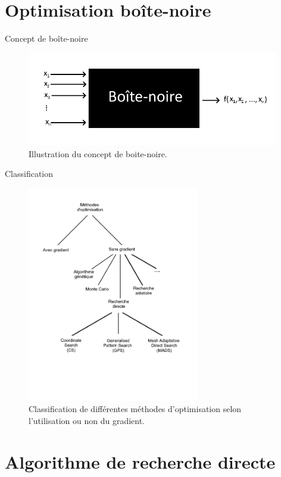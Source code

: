 \documentclass{beamer}
\begin{document}
\section{Optimisation boîte-noire}

\begin{frame}{Concept de boîte-noire}
    \begin{figure}
    \centering
    \includegraphics[width=11cm]{blackbox.png}
    \caption{Illustration du concept de boite-noire.}
    \label{fig:blackbox}
\end{figure}
\end{frame}

\begin{frame}{Classification}
    \begin{figure}[htbp]
    \centering
    \includegraphics[width=7.5cm]{classification.png}
    \caption{Classification de différentes méthodes d'optimisation selon l'utilisation ou non du gradient.}
    \label{fig:classification_methode_opti}
\end{figure}
\end{frame}



\section{Algorithme de recherche directe}
\end{document}
